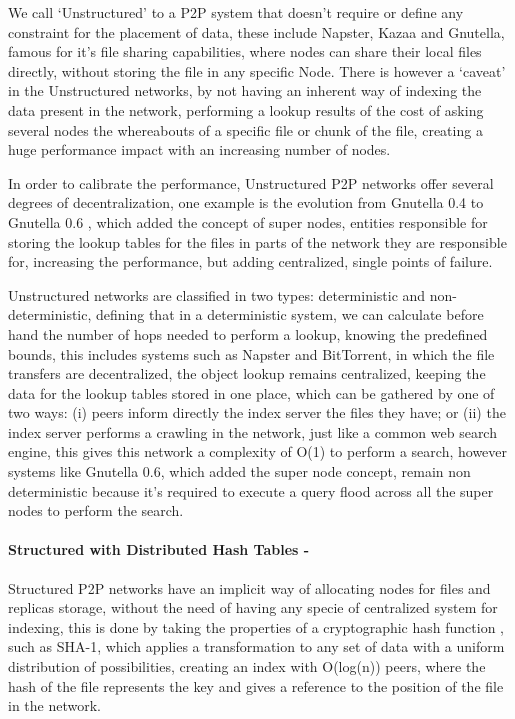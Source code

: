 We call `Unstructured' to a P2P system that doesn't require or define any constraint for the placement of data, these include Napster, Kazaa and Gnutella, famous for it's file sharing capabilities, where nodes can share their local files directly, without storing the file in any specific Node. There is however a `caveat' in the Unstructured networks, by not having an inherent way of indexing the data present in the network, performing a lookup results of the cost of asking several nodes the whereabouts of a specific file or chunk of the file, creating a huge performance impact with an increasing number of nodes. 

In order to calibrate the performance, Unstructured P2P networks offer several degrees of decentralization, one example is the evolution from Gnutella 0.4\cite{Definition2003} to Gnutella 0.6 \cite{T.Klingberg2002}\cite{Ripeanu2002a}, which added the concept of super nodes, entities responsible for storing the lookup tables for the files in parts of the network they are responsible for, increasing the performance, but adding centralized, single points of failure. 

Unstructured networks are classified\cite{Ranjan2006} in two types: deterministic and non-deterministic, defining that in a deterministic system, we can calculate before hand the number of hops needed to perform a lookup, knowing the predefined bounds, this includes systems such as Napster and BitTorrent\cite{Cohen2009}, in which the file transfers are decentralized, the object lookup remains centralized, keeping the data for the lookup tables stored in one place, which can be gathered by one of two ways: (i) peers inform directly the index server the files they have; or (ii) the index server performs a crawling in the network, just like a common web search engine, this gives this network a complexity of O(1) to perform a search, however systems like Gnutella 0.6, which added the super node concept, remain non deterministic because it's required to execute a query flood across all the super nodes to perform the search.


\paragraph{\textbf{Structured with Distributed Hash Tables -}} %
\label{par:Structured with Distributed Hash Tables}

Structured P2P networks have an implicit way of allocating nodes for files and replicas storage, without the need of having any specie of centralized system for indexing, this is done by taking the properties of a cryptographic hash function \cite{Bakhtiari}\cite{Kargerl}\cite{Preneel1999}, such as SHA-1\cite{D.Eastlake3rdMotorola;P.JonesSystems2001}, which applies a transformation to any set of data with a uniform distribution of possibilities, creating an index with O(log(n)) peers, where the hash of the file represents the key and gives a reference to the position of the file in the network.


